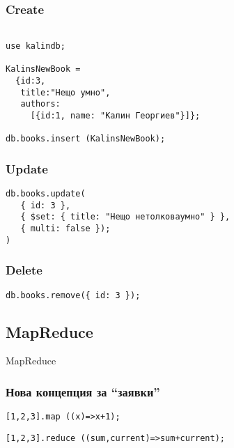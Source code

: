 \documentclass{beamer}
\begin{document}
\begin{frame}[fragile]
\frametitle{Create}

\begin{lstlisting}

use kalindb;

KalinsNewBook =
  {id:3,
   title:"Нещо умно",
   authors:
     [{id:1, name: "Калин Георгиев"}]};

db.books.insert (KalinsNewBook);
\end{lstlisting}


\end{frame}


\begin{frame}[fragile]
\frametitle{Update}

\begin{lstlisting}
db.books.update(
   { id: 3 },
   { $set: { title: "Нещо нетолковаумно" } },
   { multi: false });
)\end{lstlisting}


\end{frame}

\begin{frame}[fragile]
\frametitle{Delete}

\begin{lstlisting}
db.books.remove({ id: 3 });
\end{lstlisting}


\end{frame}

\subsection{MapReduce}

\begin{frame}
\centerline{MapReduce}
\end{frame}


\begin{frame}[fragile]
\frametitle{Нова концепция за ``заявки''}


\lstset{language=JavaScript}



\begin{lstlisting}
[1,2,3].map ((x)=>x+1);
\end{lstlisting}

\vspace{0.2cm}
\pause

\begin{lstlisting}
[1,2,3].reduce ((sum,current)=>sum+current);
\end{lstlisting}


\end{frame}
\end{document}
